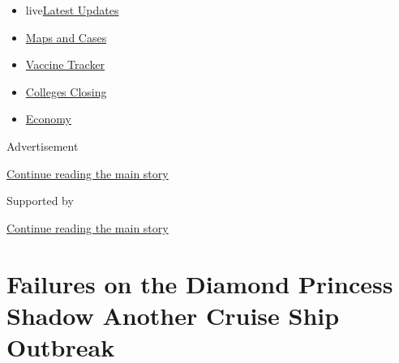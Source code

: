 \begin{itemize}
\tightlist
\item
  live\href{https://www.nytimes3xbfgragh.onion/2020/08/21/world/covid-19-coronavirus.html?name=styln-coronavirus-national\&region=TOP_BANNER\&variant=undefined\&block=storyline_menu_recirc\&action=click\&pgtype=Article\&impression_id=71018a20-e395-11ea-9c33-7348c14ae8f8}{Latest
  Updates}
\item
  \href{https://www.nytimes3xbfgragh.onion/interactive/2020/us/coronavirus-us-cases.html?name=styln-coronavirus-national\&region=TOP_BANNER\&variant=undefined\&block=storyline_menu_recirc\&action=click\&pgtype=Article\&impression_id=71018a21-e395-11ea-9c33-7348c14ae8f8}{Maps
  and Cases}
\item
  \href{https://www.nytimes3xbfgragh.onion/interactive/2020/science/coronavirus-vaccine-tracker.html?name=styln-coronavirus-national\&region=TOP_BANNER\&variant=undefined\&block=storyline_menu_recirc\&action=click\&pgtype=Article\&impression_id=71018a22-e395-11ea-9c33-7348c14ae8f8}{Vaccine
  Tracker}
\item
  \href{https://www.nytimes3xbfgragh.onion/2020/08/19/us/colleges-closing-covid.html?name=styln-coronavirus-national\&region=TOP_BANNER\&variant=undefined\&block=storyline_menu_recirc\&action=click\&pgtype=Article\&impression_id=71018a23-e395-11ea-9c33-7348c14ae8f8}{Colleges
  Closing}
\item
  \href{https://www.nytimes3xbfgragh.onion/live/2020/08/20/business/stock-market-today-coronavirus?name=styln-coronavirus-national\&region=TOP_BANNER\&variant=undefined\&block=storyline_menu_recirc\&action=click\&pgtype=Article\&impression_id=71018a24-e395-11ea-9c33-7348c14ae8f8}{Economy}
\end{itemize}

Advertisement

\protect\hyperlink{after-top}{Continue reading the main story}

Supported by

\protect\hyperlink{after-sponsor}{Continue reading the main story}

\hypertarget{failures-on-the-diamond-princess-shadow-another-cruise-ship-outbreak}{%
\section{Failures on the Diamond Princess Shadow Another Cruise Ship
Outbreak}\label{failures-on-the-diamond-princess-shadow-another-cruise-ship-outbreak}}


